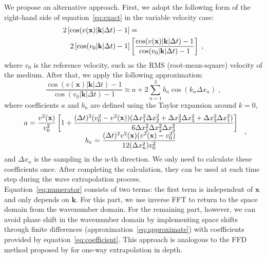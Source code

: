 We propose an alternative approach.
First, we adopt the following form of the right-hand side of equation~\ref{eq:exact} in the variable velocity case: 
\begin{eqnarray}
\label{eq:numerator}
\lefteqn{2\left[\cos(v(\mathbf{x})|\mathbf{k}|\Delta t)-1\right] = }\nonumber \\
& & 2\left[\cos(v_0|\mathbf{k}|\Delta t)-1\right]\left[\frac{\cos(v(\mathbf{x})|\mathbf{k}|\Delta t)-1}{\cos(v_0|\mathbf{k}|\Delta t)-1}\right]\;,
\end{eqnarray} 
where $v_0$ is the reference velocity, such as the RMS (root-mean-square) velocity of the medium.
After that, we apply the following approximation:
\begin{equation}
\label{eq:approximate}
\frac{\cos(v(\mathbf{x})|\mathbf{k}|\Delta t)-1}{\cos(v_0|\mathbf{k}|\Delta t)-1} \approx a + 2\sum^3_{n=1}{b_n\cos(k_n\Delta x_n)}\;,
\end{equation} 
where coefficients $a$ and $b_n$ are defined using the Taylor expansion around $k=0$,
\begin{equation}
\label{eq:coefficient}
 {\begin{array}{*{20}c}
\displaystyle a=\frac{v^2(\mathbf{x})}{v_0^2}\left[1+\frac{(\Delta t)^2(v_0^2-v^2(\mathbf{x}))(\Delta x_1^2\Delta x_2^2+\Delta x_2^2\Delta x_3^2+\Delta x_3^2\Delta x_1^2)}{6\Delta x_1^2\Delta x_2^2\Delta x_3^2}\right] \,\\ 
\displaystyle b_n=\frac{(\Delta t)^2v^2(\mathbf{x})(v^2(\mathbf{x})-v_0^2)}{12(\Delta x_n^2)v_0^2} \, \\ 
 \end{array} }  \;, 
\end{equation}
and $\Delta x_n$ is the sampling in the n-th direction. 
We only need to calculate these coefficients once. After completing the calculation, they can be used at each time step during the wave extrapolation process.
\\


Equation~\ref{eq:numerator} consists of two terms: the first term is independent of $\mathbf{x}$ and  only depends on $\mathbf{k}$. 
For this part, we use inverse FFT to return to the space domain from the wavenumber domain.
For the remaining part, however, we can avoid phase shift in the wavenumber domain by implementing space shifts 
through finite differences (approximation~\ref{eq:approximate}) with coefficients provided by equation~\ref{eq:coefficient}.
This approach is analogous to the FFD method proposed by \cite{ffd} for one-way extrapolation in depth.\\ 

